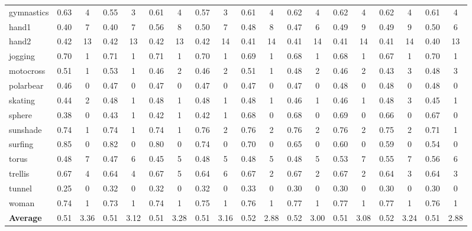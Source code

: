 \begin{table}
\begin{center}
\begin{tabular}{l c c c c c c c c c c c c c c c c c c}
gymnastics & 0.63 & 4 & 0.55 & 3 & 0.61 & 4 & 0.57 & 3 & 0.61 & 4 & 0.62 & 4 & 0.62 & 4 & 0.62 & 4 & 0.61 & 4\\
hand1 & 0.40 & 7 & 0.40 & 7 & 0.56 & 8 & 0.50 & 7 & 0.48 & 8 & 0.47 & 6 & 0.49 & 9 & 0.49 & 9 & 0.50 & 6\\
hand2 & 0.42 & 13 & 0.42 & 13 & 0.42 & 13 & 0.42 & 14 & 0.41 & 14 & 0.41 & 14 & 0.41 & 14 & 0.41 & 14 & 0.40 & 13\\
jogging & 0.70 & 1 & 0.71 & 1 & 0.71 & 1 & 0.70 & 1 & 0.69 & 1 & 0.68 & 1 & 0.68 & 1 & 0.67 & 1 & 0.70 & 1\\
motocross & 0.51 & 1 & 0.53 & 1 & 0.46 & 2 & 0.46 & 2 & 0.51 & 1 & 0.48 & 2 & 0.46 & 2 & 0.43 & 3 & 0.48 & 3\\
polarbear & 0.46 & 0 & 0.47 & 0 & 0.47 & 0 & 0.47 & 0 & 0.47 & 0 & 0.47 & 0 & 0.48 & 0 & 0.48 & 0 & 0.48 & 0\\
skating & 0.44 & 2 & 0.48 & 1 & 0.48 & 1 & 0.48 & 1 & 0.48 & 1 & 0.46 & 1 & 0.46 & 1 & 0.48 & 3 & 0.45 & 1\\
sphere & 0.38 & 0 & 0.43 & 1 & 0.42 & 1 & 0.42 & 1 & 0.68 & 0 & 0.68 & 0 & 0.69 & 0 & 0.66 & 0 & 0.67 & 0\\
sunshade & 0.74 & 1 & 0.74 & 1 & 0.74 & 1 & 0.76 & 2 & 0.76 & 2 & 0.76 & 2 & 0.76 & 2 & 0.75 & 2 & 0.71 & 1\\
surfing & 0.85 & 0 & 0.82 & 0 & 0.80 & 0 & 0.74 & 0 & 0.70 & 0 & 0.65 & 0 & 0.60 & 0 & 0.59 & 0 & 0.54 & 0\\
torus & 0.48 & 7 & 0.47 & 6 & 0.45 & 5 & 0.48 & 5 & 0.48 & 5 & 0.48 & 5 & 0.53 & 7 & 0.55 & 7 & 0.56 & 6\\
trellis & 0.67 & 4 & 0.64 & 4 & 0.67 & 5 & 0.64 & 6 & 0.67 & 2 & 0.67 & 2 & 0.67 & 2 & 0.64 & 3 & 0.64 & 3\\
tunnel & 0.25 & 0 & 0.32 & 0 & 0.32 & 0 & 0.32 & 0 & 0.33 & 0 & 0.30 & 0 & 0.30 & 0 & 0.30 & 0 & 0.30 & 0\\
woman & 0.74 & 1 & 0.73 & 1 & 0.74 & 1 & 0.75 & 1 & 0.76 & 1 & 0.77 & 1 & 0.77 & 1 & 0.77 & 1 & 0.76 & 1\\
\hline 
{\bf Average} & 0.51 & 3.36 & 0.51 & 3.12 & 0.51 & 3.28 & 0.51 & 3.16 & 0.52 & 2.88 & 0.52 & 3.00 & 0.51 & 3.08 & 0.52 & 3.24 & 0.51 & 2.88\\
\hline 
\end{tabular}
\end{center}
\end{table}